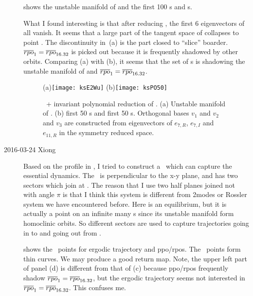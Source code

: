 \begin{description}
 shows the
unstable manifold of  and the first 100 \ppo s and \rpo s.

What I found interesting is that after reducing , the first 6
eigenvectors of  all vanish. It seems that a large part of the
tangent space of  collapses to point . The discontinuity in
\,(a) is the part closed to ``slice'' boarder.
$\overline{rpo}_{1}=\overline{rpo}_{16.32}$ is picked out because it is frequently shadowed by other
orbits.
Comparing (a) with (b), it seems that the set of \po s is shadowing the
unstable manifold of  and $\overline{rpo}_{1}=\overline{rpo}_{16.32}$.

\begin{figure}[h]
  \centering
  (a)\texttt{[image: ksE2Wu]}
  (b)\texttt{[image: ksPO50]}
  \caption{
    \SFslice\ + invariant polynomial  reduction of .
    (a) Unstable manifold of . (b) first 50 \rpo s and first 50 \ppo s.
    Orthogonal bases
    $v_1$ and $v_2$ and $v_3$ are constructed from eigenvectors of 
    $e_{7,R}$, $e_{7, I}$ and
    $e_{11, R}$ in the symmetry reduced space.
  }
  \label{fig:ksE2Wu}
\end{figure}

\item[2016-03-24 Xiong] Based on the profile in , I
tried to construct a \PoincSec\ which can capture the essential
dynamics. The \PoincSec\ is perpendicular to the x-y plane, and
has two sectors which join at . The reason that I use two
half planes joined not with angle $\pi$ is that I think this system
is different from 2modes or Rossler system we have encountered before.
Here  is an equilibrium, but it is actually a point on an infinite
many \po s since its unstable manifold form homoclinic orbits.
So different sectors are used to capture trajectories going in to
and going out from .

 shows the \PoincSec\ points for
ergodic trajectory and ppo/rpos. The \PoincSec\ points form
thin curves. We may produce a good return map. Note, the upper
left part of panel (d) is different from that of (c) because
ppo/rpos frequently shadow $\overline{rpo}_{1}=\overline{rpo}_{16.32}$, but the ergodic trajectory
seems not interested in $\overline{rpo}_{1}=\overline{rpo}_{16.32}$. This confuses me.


\end{description}
